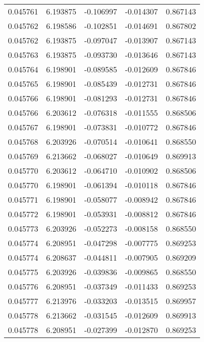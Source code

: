 \begin{tabular}{lrrrr}
0.045761    &  6.193875 & -0.106997 & -0.014307 &             0.867143 \\
0.045762    &  6.198586 & -0.102851 & -0.014691 &             0.867802 \\
0.045762    &  6.193875 & -0.097047 & -0.013907 &             0.867143 \\
0.045763    &  6.193875 & -0.093730 & -0.013646 &             0.867143 \\
0.045764    &  6.198901 & -0.089585 & -0.012609 &             0.867846 \\
0.045765    &  6.198901 & -0.085439 & -0.012731 &             0.867846 \\
0.045766    &  6.198901 & -0.081293 & -0.012731 &             0.867846 \\
0.045766    &  6.203612 & -0.076318 & -0.011555 &             0.868506 \\
0.045767    &  6.198901 & -0.073831 & -0.010772 &             0.867846 \\
0.045768    &  6.203926 & -0.070514 & -0.010641 &             0.868550 \\
0.045769    &  6.213662 & -0.068027 & -0.010649 &             0.869913 \\
0.045770    &  6.203612 & -0.064710 & -0.010902 &             0.868506 \\
0.045770    &  6.198901 & -0.061394 & -0.010118 &             0.867846 \\
0.045771    &  6.198901 & -0.058077 & -0.008942 &             0.867846 \\
0.045772    &  6.198901 & -0.053931 & -0.008812 &             0.867846 \\
0.045773    &  6.203926 & -0.052273 & -0.008158 &             0.868550 \\
0.045774    &  6.208951 & -0.047298 & -0.007775 &             0.869253 \\
0.045774    &  6.208637 & -0.044811 & -0.007905 &             0.869209 \\
0.045775    &  6.203926 & -0.039836 & -0.009865 &             0.868550 \\
0.045776    &  6.208951 & -0.037349 & -0.011433 &             0.869253 \\
0.045777    &  6.213976 & -0.033203 & -0.013515 &             0.869957 \\
0.045778    &  6.213662 & -0.031545 & -0.012609 &             0.869913 \\
0.045778    &  6.208951 & -0.027399 & -0.012870 &             0.869253 \\

\end{tabular}
